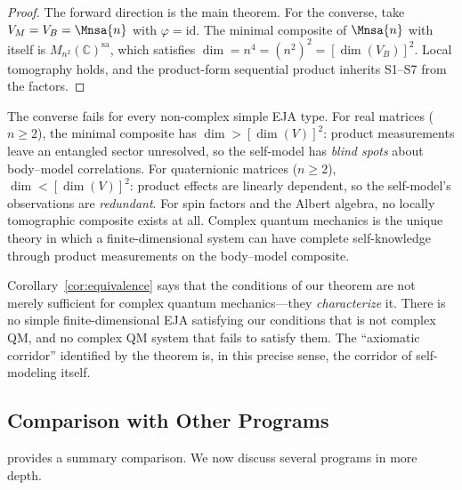 \begin{proof}
  The forward direction is the main theorem.  For the converse,
  take $V_{M} = V_{B} = \Mnsa{n}$ with $\varphi = \mathrm{id}$.
  The minimal composite of $\Mnsa{n}$ with itself is
  $M_{n^{2}}(\mathbb{C})^{\mathrm{sa}}$, which satisfies
  $\dim = n^{4} = (n^{2})^{2} = [\dim(V_{B})]^{2}$.  Local
  tomography holds, and the product-form sequential product inherits
  S1--S7 from the factors.
\end{proof}

\begin{remark}
  The converse fails for every non-complex simple EJA type.
  For real matrices ($n \ge 2$), the minimal composite has
  $\dim > [\dim(V)]^{2}$: product measurements leave an entangled
  sector unresolved, so the self-model has \emph{blind spots} about
  body--model correlations.  For quaternionic matrices ($n \ge 2$),
  $\dim < [\dim(V)]^{2}$: product effects are linearly dependent,
  so the self-model's observations are \emph{redundant}.  For spin
  factors and the Albert algebra, no locally tomographic composite
  exists at all.  Complex quantum mechanics is the unique theory in
  which a finite-dimensional system can have complete self-knowledge
  through product measurements on the body--model composite.
\end{remark}

\noindent
Corollary~\ref{cor:equivalence} says that the conditions of our
theorem are not merely sufficient for complex quantum mechanics---they
\emph{characterize} it.  There is no simple finite-dimensional EJA
satisfying our conditions that is not complex QM, and no complex QM
system that fails to satisfy them.  The ``axiomatic corridor''
identified by the theorem is, in this precise sense, the corridor of
self-modeling itself.


\subsection{Comparison with Other Programs}\label{subsec:comparison}

 provides a summary comparison.  We now discuss
several programs in more depth.

